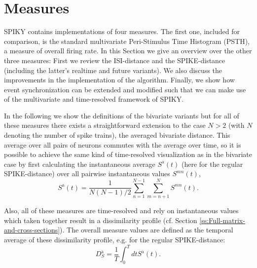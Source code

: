 \documentclass[10pt,twocolumn]{elsart5p}
\begin{document}
%
%
\section{\label{s:Measures} Measures}

SPIKY contains implementations of four measures. The first one, included for comparison, is the standard multivariate Peri-Stimulus Time Histogram (PSTH), a measure of overall firing rate. In this Section we give an overview over the other three measures: First we review the ISI-distance and the SPIKE-distance (including the latter's realtime and future variants). We also discuss the improvements in the implementation of the algorithm. Finally, we show how event synchronization can be extended and modified such that we can make use of the multivariate and time-resolved framework of SPIKY.

In the following we show the definitions of the bivariate variants but for all of these measures there exists a straightforward extension to the case $N > 2$ (with $N$ denoting the number of spike trains), the averaged bivariate distance. This average over all pairs of neurons commutes with the average over time, so it is possible to achieve the same kind of time-resolved visualization as in the bivariate case by first calculating the instantaneous average $S^{\mathrm {a}} (t)$ (here for the regular SPIKE-distance) over all pairwise instantaneous values $S^{mn} (t)$,
%
\begin{equation} \label{eq:Bivariate-Average}
    S^{\mathrm {a}} (t) = \frac{1}{N(N-1)/2}\sum_{n=1}^{N-1} \sum_{m=n+1}^N S^{mn} (t).
\end{equation}

Also, all of these measures are time-resolved and rely on instantaneous values which taken together result in a dissimilarity profile (cf. Section \ref{ss:Full-matrix-and-cross-sections}). The overall measure values are defined as the temporal average of these dissimilarity profile, e.g. for the regular SPIKE-distance:
%
\begin{equation} \label{eq:Temporal-Average2}
    D_S^{\mathrm {a}} = \frac{1}{T} \int_0^T dt S^{\mathrm {a}} (t).
\end{equation}
\end{document}
